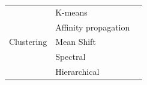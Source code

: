\documentclass[twoside,11pt]{article}
\begin{document}
\begin{table}[hbtp]
{\begin{tabular}{lll}
  \multirow{5}{*}{Clustering} & K-means &  \citep{bishop2006pattern}\\
  & Affinity propagation & \citep{frey2007clustering} \\
  & Mean Shift & \citep{comaniciu2002mean} \\
  & Spectral & \citep{shi2000normalized} \\
  & Hierarchical & \citep{friedman2001elements} \\

  \bottomrule
  \end{tabular}}
\end{table}


\vskip 0.2in

\end{document}
